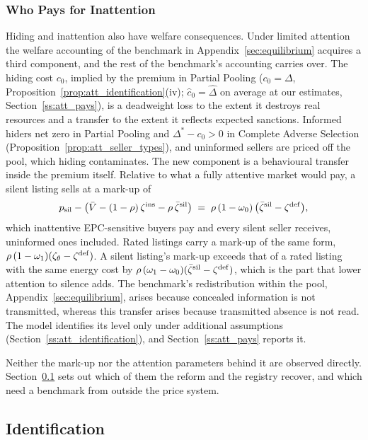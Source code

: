 \subsubsection{Who Pays for Inattention}
\label{ss:att_welfare}

Hiding and inattention also have welfare consequences. Under limited attention the welfare accounting of the benchmark in Appendix~\ref{sec:equilibrium} acquires a third component, and the rest of the benchmark's accounting carries over. The hiding cost $c_0$, implied by the premium in Partial Pooling ($c_0=\Delta$, Proposition~\ref{prop:att_identification}(iv); $\hat c_0=\hat\Delta$ on average at our estimates, Section~\ref{ss:att_pays}), is a deadweight loss to the extent it destroys real resources and a transfer to the extent it reflects expected sanctions. Informed hiders net zero in Partial Pooling and $\Delta^*-c_0>0$ in Complete Adverse Selection (Proposition~\ref{prop:att_seller_types}), and uninformed sellers are priced off the pool, which hiding contaminates. The new component is a behavioural transfer inside the premium itself. Relative to what a fully attentive market would pay, a silent listing sells at a mark-up of
\begin{equation}
    p_{\rm sil}-\big(\bar V-(1-\rho)\,\zeta^{\rm ins}-\rho\,\bar \zeta^{\rm sil}\big)\;=\;\rho\,(1-\omega_0)\,\big(\bar \zeta^{\rm sil}-\zeta^{\rm def}\big),
    \label{eq:att_markup}
\end{equation}
which inattentive EPC-sensitive buyers pay and every silent seller receives, uninformed ones included. Rated listings carry a mark-up of the same form, $\rho\,(1-\omega_1)(\zeta_\theta-\zeta^{\rm def})$. A silent listing's mark-up exceeds that of a rated listing with the same energy cost by $\rho\,(\omega_1-\omega_0)(\bar\zeta^{\rm sil}-\zeta^{\rm def})$, which is the part that lower attention to silence adds. The benchmark's redistribution within the pool, Appendix~\ref{sec:equilibrium}, arises because concealed information is not transmitted, whereas this transfer arises because transmitted absence is not read. The model identifies its level only under additional assumptions (Section~\ref{ss:att_identification}), and Section~\ref{ss:att_pays} reports it.

Neither the mark-up nor the attention parameters behind it are observed directly. Section~\ref{sec:identification} sets out which of them the reform and the registry recover, and which need a benchmark from outside the price system.

\subsection{Identification}
\label{sec:identification}

